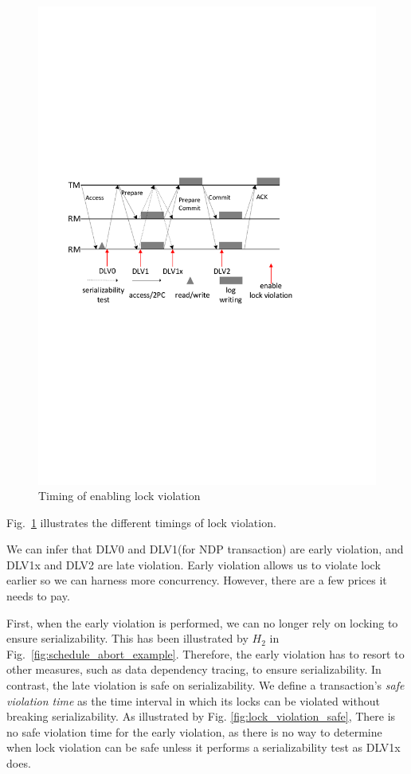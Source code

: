 \documentclass[conference]{IEEEtran}
\begin{document}
\begin{figure}[tbp]
  \centerline{\includegraphics[scale=0.50]{lock_violation_time.pdf}}
  \caption
  {Timing of enabling lock violation}
\label{fig:lock_violation_time}
\end{figure}

Fig.~\ref{fig:lock_violation_time} illustrates the different timings of lock violation.

We can infer that DLV0 and DLV1(for NDP transaction) are early violation, and DLV1x and DLV2 are late violation.
Early violation allows us to violate lock earlier so we can harness more concurrency. However, there are a few prices it needs to pay.

First, when the early violation is performed, we can no longer rely on locking to ensure serializability. This has been illustrated by ${H_2}$ in Fig.~\ref{fig:schedule_abort_example}.
Therefore, the early violation has to resort to other measures, such as data dependency tracing, to ensure serializability.
In contrast, the late violation is safe on serializability.
We define a transaction's \emph{safe violation time} as the time interval in which its locks can be violated without breaking serializability.
As illustrated by Fig. \ref{fig:lock_violation_safe},
There is no safe violation time for the early violation, as there is no way to determine when lock violation can be safe unless it performs a serializability test as DLV1x does.
\end{document}
